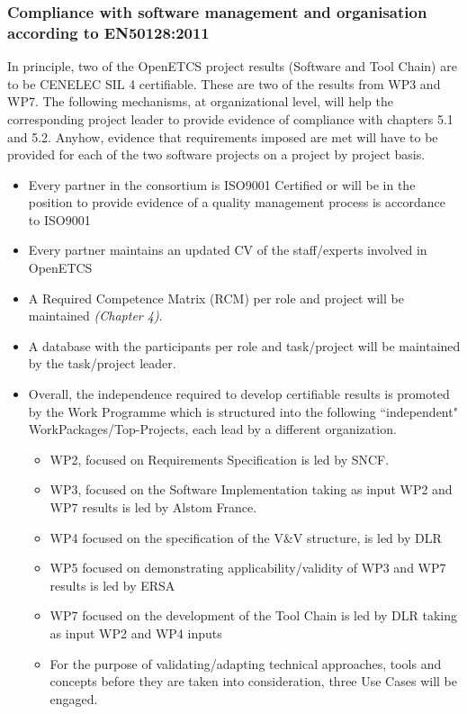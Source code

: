 \documentclass{template/openetcs_article}
\begin{document}
\subsubsection{Compliance with software management and organisation according to EN50128:2011}
In principle, two of the OpenETCS project results (Software and Tool Chain) are to be CENELEC SIL 4 certifiable. These are two of the results from WP3 and WP7. The following mechanisms, at organizational level, will help the corresponding project leader to provide evidence of compliance with chapters 5.1 and 5.2. Anyhow, evidence that requirements imposed are met will have to be provided for each of the two software projects on a project by project basis. 

\begin{itemize}
\item Every partner in the consortium is ISO9001 Certified or will be in the position to provide evidence of a quality management process is accordance to ISO9001
\item Every partner maintains an updated CV of the staff/experts involved in OpenETCS
\item A Required Competence Matrix (RCM) per role and project will be maintained \textit{(Chapter 4)}.
\item A database with the participants per role and task/project will be maintained by the task/project leader.
\item Overall, the independence required to develop certifiable results is promoted by the Work Programme which is structured into the following “independent" WorkPackages/Top-Projects, each lead by a different organization.  
\begin{itemize}
\item WP2, focused on Requirements Specification is led by SNCF.
\item WP3, focused on the Software Implementation taking as input WP2 and WP7 results is led by Alstom France.
\item WP4 focused on the specification of the V\&V structure, is led by DLR
\item WP5 focused on demonstrating applicability/validity of WP3 and WP7 results is led by ERSA
\item WP7 focused on the development of the Tool Chain is led by DLR taking as input WP2 and WP4 inputs
\item For the purpose of validating/adapting technical approaches, tools and concepts before they are taken into consideration, three Use Cases will be engaged.

\end{itemize}
\end{itemize}
\end{document}
